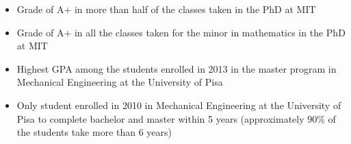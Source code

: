 \documentclass[11pt,a4paper,sans]{moderncv}
\begin{document}
\begin{itemize}

\item Grade of A$+$ in more than half of the classes taken in the PhD at MIT

\item Grade of A$+$ in all the classes taken for the minor in mathematics in the PhD at MIT

\item Highest GPA among the students enrolled in 2013 in the master program in Mechanical Engineering at the University of Pisa

\item Only student enrolled in 2010 in Mechanical Engineering at the University of Pisa to complete bachelor and master within 5 years (approximately $90\%$ of the students take more than 6 years)

\end{itemize}

\end{document}
